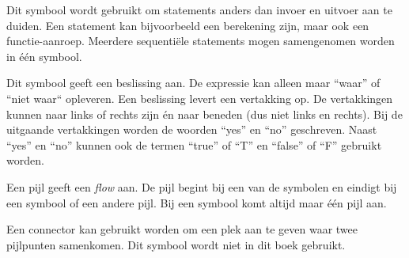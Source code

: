 \begin{minipage}[c]{0.3\textwidth}
\centering
{}
\end{minipage}\hfill%
\begin{minipage}[c]{0.68\textwidth}
Dit symbool wordt gebruikt om statements anders dan invoer en uitvoer aan te duiden. Een statement kan bijvoorbeeld een berekening zijn, maar ook een functie-aanroep. Meerdere sequenti\"ele statements mogen samengenomen worden in \'e\'en symbool.
\end{minipage}
\bigskip

\begin{minipage}[c]{0.3\textwidth}
\centering
{}
\end{minipage}\hfill%
\begin{minipage}[c]{0.68\textwidth}
Dit symbool geeft een beslissing aan. De expressie kan alleen maar ``waar'' of ``niet waar`` opleveren. Een beslissing levert een vertakking op. De vertakkingen kunnen naar links of rechts zijn \'en naar beneden (dus niet links en rechts). Bij de uitgaande vertakkingen worden de woorden ``yes'' en ``no'' geschreven. Naast
``yes'' en ``no'' kunnen ook de termen ``true'' of ``T'' en ``false'' of ``F'' gebruikt worden.
\end{minipage}
\bigskip

\begin{minipage}[c]{0.3\textwidth}
\centering
{}
\end{minipage}\hfill%
\begin{minipage}[c]{0.68\textwidth}
Een pijl geeft een \textsl{flow} aan. De pijl begint bij een van de symbolen en eindigt bij een symbool of een andere pijl. Bij een symbool komt altijd maar \'e\'en pijl aan.
\end{minipage}
\bigskip

\begin{minipage}[c]{0.3\textwidth}
\centering
\end{minipage}\hfill%
\begin{minipage}[c]{0.68\textwidth}
Een connector kan gebruikt worden om een plek aan te geven waar twee pijlpunten samenkomen. Dit symbool wordt niet in dit boek gebruikt.
\end{minipage}


